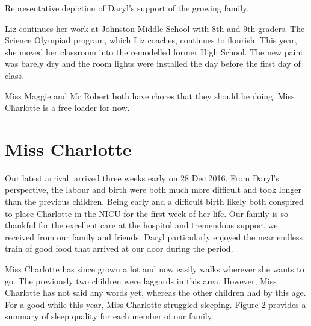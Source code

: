 \documentclass[letterpaper,11pt]{article}
\makeatletter
\newenvironment{figurehere}
  {\def\@captype{figure}}
  {}
\makeatother
\begin{document}
\begin{multicols}{2}
\begin{figurehere}
 \centering   
 \caption{Representative depiction of Daryl's support of the growing family.}
\end{figurehere}

Liz continues her work at Johnston Middle School with 8th and 9th graders. 
The Science Olympiad program, which Liz coaches, continues to flourish. 
This year, she moved her classroom into the remodelled former High School.  The
new paint was barely dry and the room lights were installed the day before the
first day of class.

Miss Maggie and Mr Robert both have chores that they should be doing.  Miss
Charlotte is a free loader for now.

\section{Miss Charlotte}

Our latest arrival, arrived three weeks early on 28 Dec 2016.  From Daryl's
perspective, the labour and birth were both much more difficult and took longer
than the previous children.  Being early and a difficult birth likely both
conspired to place Charlotte in the NICU for the first week of her life.  Our
family is so thankful for the excellent care at the hospitol and tremendous
support we received from our family and friends.  Daryl particularly enjoyed the
near endless train of good food that arrived at our door during the period.

Miss Charlotte has since grown a lot and now easily walks wherever she wants to
go. The previously two children were laggards in this area.  However,
Miss Charlotte has not said any words yet, whereas the other children had by
this age.  For a good while this year, Miss Charlotte struggled sleeping. 
Figure 2 provides a summary of sleep quality for each member of our family.


\end{multicols}
\end{document}
